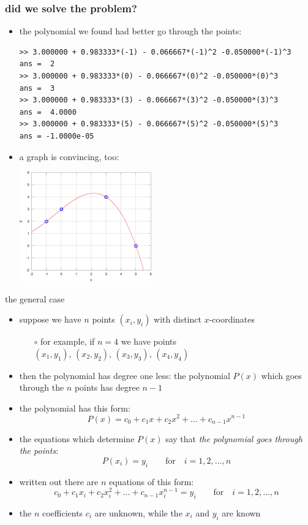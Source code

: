 \documentclass[10pt,hyperref]{beamer}
\begin{document}
\begin{frame}[fragile]
\frametitle{did we solve the problem?}

\begin{itemize}
\item the polynomial we found had better go through the points:
\begin{Verbatim}[frame=single,fontfamily=courier,fontsize=\scriptsize]
>> 3.000000 + 0.983333*(-1) - 0.066667*(-1)^2 -0.050000*(-1)^3
ans =  2
>> 3.000000 + 0.983333*(0) - 0.066667*(0)^2 -0.050000*(0)^3
ans =  3
>> 3.000000 + 0.983333*(3) - 0.066667*(3)^2 -0.050000*(3)^3
ans =  4.0000
>> 3.000000 + 0.983333*(5) - 0.066667*(5)^2 -0.050000*(5)^3
ans = -1.0000e-05
\end{Verbatim}
\item a graph is convincing, too:
  \begin{center}
  \includegraphics[width=0.45\textwidth]{ex1solved}
  \end{center}
\end{itemize}
\end{frame}


\begin{frame}{the general case}

\begin{itemize}
\item suppose we have $n$ points $(x_i,y_i)$ with distinct $x$-coordinates
  \begin{itemize}
  \item[$\circ$]  for example, if $n=4$ we have points $(x_1,y_1),\,(x_2,y_2),\,(x_3,y_3),\,(x_4,y_4)$
  \end{itemize}
\item then the polynomial has degree one less:  the polynomial $P(x)$ which goes through the $n$ points has degree $n-1$
\item the polynomial has this form:
	$$P(x) = c_0 + c_1 x + c_2 x^2 + \dots + c_{n-1} x^{n-1}$$
\item the equations which determine $P(x)$ say that \emph{the polynomial goes through the points}:
	$$P(x_i) = y_i \qquad \text{for} \quad i=1,2,\dots,n$$
\item written out there are $n$ equations of this form:
	$$c_0 + c_1 x_i + c_2 x_i^2 + \dots + c_{n-1} x_i^{n-1} = y_i \qquad \text{for} \quad i=1,2,\dots,n$$
\item the $n$ coefficients $c_i$ are unknown, while the $x_i$ and $y_i$ are known
\end{itemize}
\end{frame}
\end{document}
